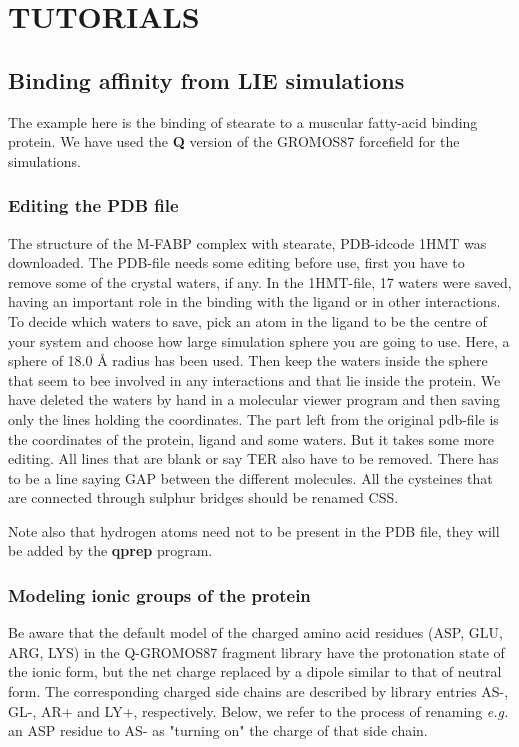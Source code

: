 \documentclass[a4paper,10pt]{article}
\begin{document}
\section{TUTORIALS}
\subsection{Binding affinity from LIE simulations}
The example here  is the binding of stearate to  a muscular fatty-acid
binding protein. We have used the \textbf{Q} version of the GROMOS87 forcefield
for the simulations.

\subsubsection{Editing the PDB file}
The structure of the M-FABP complex with stearate, PDB-idcode 1HMT was
downloaded. The PDB-file needs some editing before use, first you have
to remove  some of the  crystal waters, if  any. In the  1HMT-file, 17
waters were  saved, having an important  role in the binding  with the
ligand or in other interactions. To  decide which waters to save, pick
an atom in the  ligand to be the centre of your  system and choose how
large simulation sphere  you are going to use. Here,  a sphere of 18.0
{\AA} radius  has been used.  Then keep  the waters inside  the sphere
that seem to bee involved in  any interactions and that lie inside the
protein. We  have deleted  the waters  by hand  in a  molecular viewer
program and  then saving only  the lines holding the  coordinates. The
part  left  from the  original  pdb-file  is  the coordinates  of  the
protein, ligand and  some waters. But it takes some  more editing. All
lines that are blank or say TER  also have to be removed. There has to
be  a  line  saying  GAP  between the  different  molecules.  All  the
cysteines that are connected through sulphur bridges should be renamed
CSS.

Note also that hydrogen atoms need not  to be present in the PDB file,
they will be added by the \textbf{qprep} program.

\subsubsection{Modeling ionic groups of the protein}
Be aware  that the default  model of  the charged amino  acid residues
(ASP,  GLU, ARG,  LYS) in  the  Q-GROMOS87 fragment  library have  the
protonation state of the ionic form,  but the net charge replaced by a
dipole similar to that of neutral form. The corresponding charged side
chains  are  described by  library  entries  AS-,  GL-, AR+  and  LY+,
respectively. Below, we  refer to the process  of renaming \emph{e.g.}
an ASP residue to AS- as "turning on" the charge of that side chain.
\end{document}
